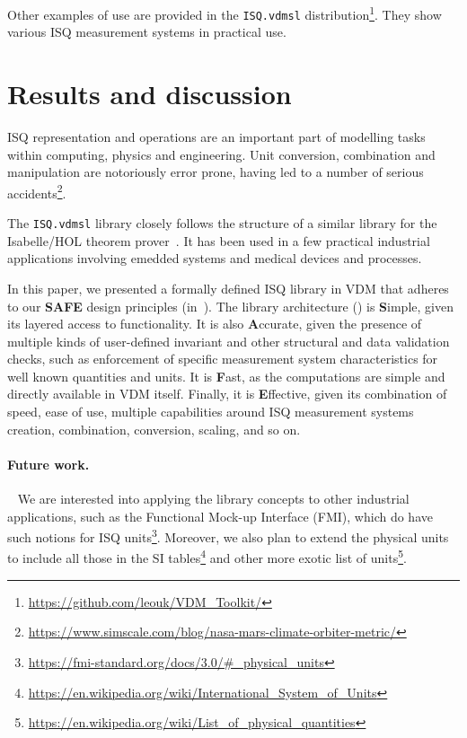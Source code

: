 \documentclass[runningheads,a4paper]{llncs}
\begin{document}
Other examples of use are provided in the \texttt{ISQ.vdmsl} distribution\footnote{\url{https://github.com/leouk/VDM_Toolkit/}}. They show various ISQ measurement systems in practical use.

\section{Results and discussion}\label{sec:Results}

\gls{ISQ} representation and operations are an important part of modelling tasks within computing, physics and engineering. Unit conversion, combination and manipulation are notoriously error prone, having led to a number of serious accidents\footnote{\url{https://www.simscale.com/blog/nasa-mars-climate-orbiter-metric/}}.%

The \texttt{ISQ.vdmsl} library closely follows the structure of a similar library for the Isabelle/HOL theorem prover~\cite{Physical_Quantities-AFP}. It has been used in a few practical industrial applications involving emedded systems and medical devices and processes.  

In this paper, we presented a formally defined \gls{ISQ} library in VDM that adheres to our \textbf{SAFE} design principles (in~). The library architecture () is \textbf{S}imple, given its layered access to functionality. It is also \textbf{A}ccurate, given the presence of multiple kinds of user-defined invariant and other structural and data validation checks, such as enforcement of specific measurement system characteristics for well known quantities and units. It is \textbf{F}ast, as the computations are simple and directly available in VDM itself. Finally, it is \textbf{E}ffective, given its combination of speed, ease of use, multiple capabilities around ISQ measurement systems creation, combination, conversion, scaling, and so on.   

\paragraph*{Future work.}~
%
We are interested into applying the library concepts to other industrial applications, such as the Functional Mock-up Interface (FMI), which do have such notions for ISQ units\footnote{\url{https://fmi-standard.org/docs/3.0/\#_physical_units}}. Moreover, we also plan to extend the physical units to include all those in the SI tables\footnote{\url{https://en.wikipedia.org/wiki/International_System_of_Units}} and other more exotic list of units\footnote{\url{https://en.wikipedia.org/wiki/List_of_physical_quantities}}. 
\end{document}
